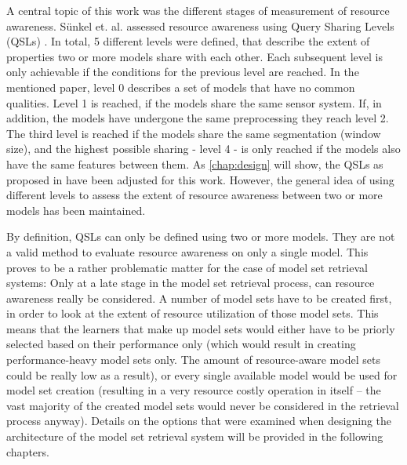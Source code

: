 A central topic of this work was the different stages of measurement of resource awareness. Sünkel et. al. assessed resource awareness using Query Sharing Levels (QSLs) \cite{sunkel2022}. In total, 5 different levels were defined, that describe the extent of properties two or more models share with each other. Each subsequent level is only achievable if the conditions for the previous level are reached. In the mentioned paper, level 0 describes a set of models that have no common qualities. Level 1 is reached, if the models share the same sensor system. If, in addition, the models have undergone the same preprocessing they reach level 2. The third level is reached if the models share the same segmentation (window size), and the highest possible sharing - level 4 - is only reached if the models also have the same features between them. As \autoref{chap:design} will show, the QSLs as proposed in \cite{sunkel2022} have been adjusted for this work. However, the general idea of using different levels to assess the extent of resource awareness between two or more models has been maintained.

By definition, QSLs can only be defined using two or more models. They are not a valid method to evaluate resource awareness on only a single model. This proves to be a rather problematic matter for the case of model set retrieval systems: Only at a late stage in the model set retrieval process, can resource awareness really be considered. A number of model sets have to be created first, in order to look at the extent of resource utilization of those model sets. This means that the learners that make up model sets would either have to be priorly selected based on their performance only (which would result in creating performance-heavy model sets only. The amount of resource-aware model sets could be really low as a result), or every single available model would be used for model set creation (resulting in a very resource costly operation in itself – the vast majority of the created model sets would never be considered in the retrieval process anyway). Details on the options that were examined when designing the architecture of the model set retrieval system will be provided in the following chapters.

